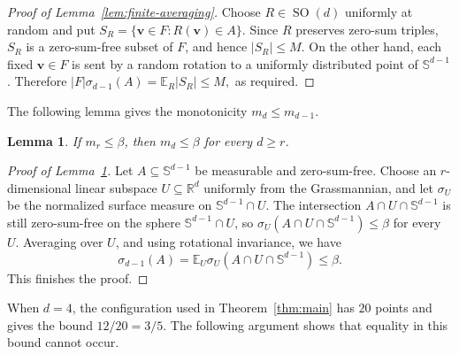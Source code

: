 \documentclass[11pt]{article}
\newtheorem{lemma}[theorem]{Lemma}
\newcommand{\SO}{\operatorname{SO}}
\theoremstyle{definition}
\begin{document}
\begin{proof}[Proof of Lemma~\ref{lem:finite-averaging}]
Choose \(R\in\SO(d)\) uniformly at random and put
\(
    S_{R}=\{\boldsymbol{v}\in F:R(\boldsymbol{v})\in A\}.
\)
Since \(R\) preserves zero-sum triples, \(S_{R}\) is a zero-sum-free subset
of \(F\), and hence \(|S_{R}|\le M\).  On the other hand, each fixed
\(\boldsymbol{v}\in F\) is sent by a random rotation to a uniformly
distributed point of \(\mathbb S^{d-1}\).  Therefore
\(
    |F|\sigma_{d-1}(A)
    =
    \mathbb E_{R}|S_{R}|
    \le M,
\)
as required.
\end{proof}


The following lemma gives the monotonicity
\(m_{d}\le m_{d-1}\). 

\begin{lemma}\label{lem:monotonicity}
If \(m_{r}\le \beta\), then \(m_{d}\le \beta\) for every \(d\ge r\).
\end{lemma}

\begin{proof}[Proof of Lemma~\ref{lem:monotonicity}]
Let \(A\subseteq\mathbb S^{d-1}\) be measurable and zero-sum-free.  Choose
an \(r\)-dimensional linear subspace \(U\subseteq\mathbb R^d\) uniformly
from the Grassmannian, and let \(\sigma_{U}\) be the normalized surface
measure on \(\mathbb S^{d-1}\cap U\).  The intersection
\(A\cap U\cap\mathbb S^{d-1}\) is still zero-sum-free on the sphere
\(\mathbb S^{d-1}\cap U\), so \(\sigma_{U}(A\cap U\cap\mathbb S^{d-1})\le
\beta\) for every \(U\).  Averaging over \(U\), and using rotational
invariance, we have
\[
    \sigma_{d-1}(A)
    =
    \mathbb E_{U}\sigma_{U}(A\cap U\cap\mathbb S^{d-1})
    \le \beta.
\]
This finishes the proof.
\end{proof}
When \(d=4\), the configuration used in
Theorem~\ref{thm:main} has \(20\) points and gives the bound \(12/20=3/5\). The following
argument shows that equality in this bound cannot occur. 
\end{document}

